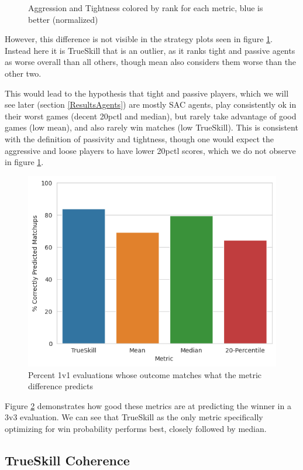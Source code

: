 \begin{figure}[H]
{}
\caption{Aggression and Tightness colored by rank for each metric, blue is better (normalized)}
\label{AggTightRank}
\end{figure}

However, this difference is not visible in the strategy plots seen in figure \ref{AggTightRank}. Instead here it is TrueSkill that is an outlier, as it ranks tight and passive agents as worse overall than all others, though mean also considers them worse than the other two.

This would lead to the hypothesis that tight and passive players, which we will see later (section \ref{ResultsAgents}) are mostly SAC agents, play consistently ok in their worst games (decent 20pctl and median), but rarely take advantage of good games (low mean), and also rarely win matches (low TrueSkill). This is consistent with the definition of passivity and tightness, though one would expect the aggressive and loose players to have lower 20pctl scores, which we do not observe in figure \ref{AggTightRank}.


\begin{figure}[H]
\centering
    \includegraphics[width=0.8\linewidth]{Results/figures/upsets_per_metric.png}
\caption{Percent 1v1 evaluations whose outcome matches what the metric difference predicts}
\label{UpsetsPlot}
\end{figure}

Figure \ref{UpsetsPlot} demonstrates how good these metrics are at predicting the winner in a 3v3 evaluation. We can see that TrueSkill as the only metric specifically optimizing for win probability performs best, closely followed by median.


\subsection{TrueSkill Coherence}

